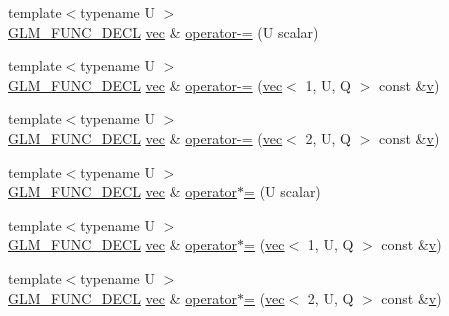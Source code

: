 \begin{DoxyCompactItemize}
\item 
{\footnotesize template$<$typename U $>$ }\\\mbox{\hyperlink{setup_8hpp_ab2d052de21a70539923e9bcbf6e83a51}{G\+L\+M\+\_\+\+F\+U\+N\+C\+\_\+\+D\+E\+CL}} \mbox{\hyperlink{structglm_1_1vec}{vec}} \& \mbox{\hyperlink{structglm_1_1vec_3_012_00_01_t_00_01_q_01_4_a6961040865246e7250dd6cf13956d09e}{operator-\/=}} (U scalar)
\item 
{\footnotesize template$<$typename U $>$ }\\\mbox{\hyperlink{setup_8hpp_ab2d052de21a70539923e9bcbf6e83a51}{G\+L\+M\+\_\+\+F\+U\+N\+C\+\_\+\+D\+E\+CL}} \mbox{\hyperlink{structglm_1_1vec}{vec}} \& \mbox{\hyperlink{structglm_1_1vec_3_012_00_01_t_00_01_q_01_4_ad0145e78e71199aad6aa61d5e899f1eb}{operator-\/=}} (\mbox{\hyperlink{structglm_1_1vec}{vec}}$<$ 1, U, Q $>$ const \&\mbox{\hyperlink{_s_d_l__opengl_8h_a10a82eabcb59d2fcd74acee063775f90}{v}})
\item 
{\footnotesize template$<$typename U $>$ }\\\mbox{\hyperlink{setup_8hpp_ab2d052de21a70539923e9bcbf6e83a51}{G\+L\+M\+\_\+\+F\+U\+N\+C\+\_\+\+D\+E\+CL}} \mbox{\hyperlink{structglm_1_1vec}{vec}} \& \mbox{\hyperlink{structglm_1_1vec_3_012_00_01_t_00_01_q_01_4_a8051ed9c25b34e08a29f6eee8d0ea3dc}{operator-\/=}} (\mbox{\hyperlink{structglm_1_1vec}{vec}}$<$ 2, U, Q $>$ const \&\mbox{\hyperlink{_s_d_l__opengl_8h_a10a82eabcb59d2fcd74acee063775f90}{v}})
\item 
{\footnotesize template$<$typename U $>$ }\\\mbox{\hyperlink{setup_8hpp_ab2d052de21a70539923e9bcbf6e83a51}{G\+L\+M\+\_\+\+F\+U\+N\+C\+\_\+\+D\+E\+CL}} \mbox{\hyperlink{structglm_1_1vec}{vec}} \& \mbox{\hyperlink{structglm_1_1vec_3_012_00_01_t_00_01_q_01_4_a4a645fcc1832d33c8be9c5dfcb4107e8}{operator$\ast$=}} (U scalar)
\item 
{\footnotesize template$<$typename U $>$ }\\\mbox{\hyperlink{setup_8hpp_ab2d052de21a70539923e9bcbf6e83a51}{G\+L\+M\+\_\+\+F\+U\+N\+C\+\_\+\+D\+E\+CL}} \mbox{\hyperlink{structglm_1_1vec}{vec}} \& \mbox{\hyperlink{structglm_1_1vec_3_012_00_01_t_00_01_q_01_4_acf5a22f65506ef65ad1183416e0ea077}{operator$\ast$=}} (\mbox{\hyperlink{structglm_1_1vec}{vec}}$<$ 1, U, Q $>$ const \&\mbox{\hyperlink{_s_d_l__opengl_8h_a10a82eabcb59d2fcd74acee063775f90}{v}})
\item 
{\footnotesize template$<$typename U $>$ }\\\mbox{\hyperlink{setup_8hpp_ab2d052de21a70539923e9bcbf6e83a51}{G\+L\+M\+\_\+\+F\+U\+N\+C\+\_\+\+D\+E\+CL}} \mbox{\hyperlink{structglm_1_1vec}{vec}} \& \mbox{\hyperlink{structglm_1_1vec_3_012_00_01_t_00_01_q_01_4_ac151d57702d8baed4fa936dc7a39cc15}{operator$\ast$=}} (\mbox{\hyperlink{structglm_1_1vec}{vec}}$<$ 2, U, Q $>$ const \&\mbox{\hyperlink{_s_d_l__opengl_8h_a10a82eabcb59d2fcd74acee063775f90}{v}})

\end{DoxyCompactItemize}
